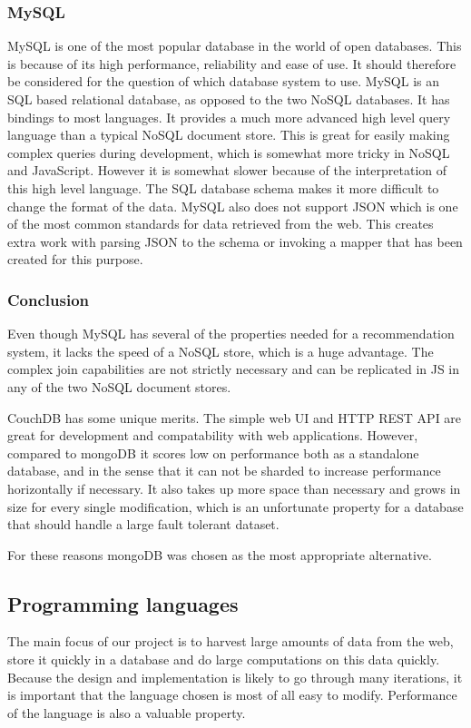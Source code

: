 \subsubsection*{MySQL}
MySQL is one of the most popular database in the world of open databases. This is because of its high performance, reliability and ease of use. It should therefore be considered for the question of which database system to use. MySQL is an SQL based relational database, as opposed to the two NoSQL databases. It has bindings to most languages. It provides a much more advanced high level query language than a typical NoSQL document store. This is great for easily making complex queries during development, which is somewhat more tricky in NoSQL and JavaScript. However it is somewhat slower because of the interpretation of this high level language. The SQL database schema makes it more difficult to change the format of the data. MySQL also does not support JSON which is one of the most common standards for data retrieved from the web. This creates extra work with parsing JSON to the schema or invoking a mapper that has been created for this purpose.
\cite{mysql-about}


\subsubsection{Conclusion}
Even though MySQL has several of the properties needed for a recommendation system, it lacks the speed of a NoSQL store, which is a huge advantage. The complex join capabilities are not strictly necessary and can be replicated in JS in any of the two NoSQL document stores.

CouchDB has some unique merits. The simple web UI and HTTP REST API are great for development and compatability with web applications. However, compared to mongoDB it scores low on performance both as a standalone database, and in the sense that it can not be sharded to increase performance horizontally if necessary. It also takes up more space than necessary and grows in size for every single modification, which is an unfortunate property for a database that should handle a large fault tolerant dataset.

For these reasons mongoDB was chosen as the most appropriate alternative.


\subsection{Programming languages}
The main focus of our project is to harvest large amounts of data from the web, store it quickly in a database and do large computations on this data quickly. Because the design and implementation is likely to go through many iterations, it is important that the language chosen is most of all easy to modify. Performance of the language is also a valuable property.

